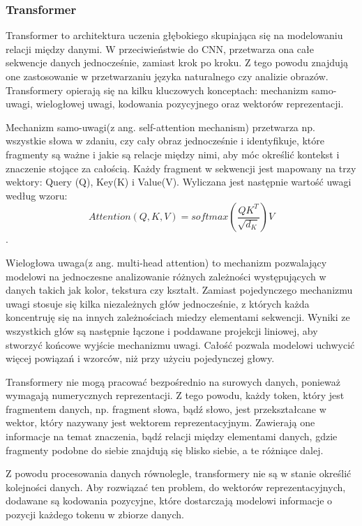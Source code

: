 \subsubsection{Transformer}
Transformer to architektura uczenia głębokiego skupiająca się na modelowaniu relacji między danymi. W przeciwieństwie do CNN, przetwarza ona całe sekwencje danych jednocześnie, zamiast krok po kroku. Z tego powodu znajdują one zastosowanie w przetwarzaniu języka naturalnego czy analizie obrazów. Transformery opierają się na kilku kluczowych konceptach: mechanizm samo-uwagi, wielogłowej uwagi, kodowania pozycyjnego oraz wektorów reprezentacji.

Mechanizm samo-uwagi(z ang. self-attention mechanism) przetwarza np. wszystkie słowa w zdaniu, czy cały obraz jednocześnie i identyfikuje, które fragmenty są ważne \newline i jakie są relacje między nimi, aby móc określić kontekst i znaczenie stojące za całością. Każdy fragment w sekwencji jest mapowany na trzy wektory: Query (Q), Key(K) i Value(V). Wyliczana jest następnie wartość uwagi według wzoru: $$Attention(Q,K,V) = softmax(\frac{QK^{T}}{\sqrt{d_{K}}})V $$.

Wielogłowa uwaga(z ang. multi-head attention) to mechanizm pozwalający modelowi na jednoczesne analizowanie różnych zależności występujących w danych takich jak kolor, tekstura czy kształt.
Zamiast pojedynczego mechanizmu uwagi stosuje się kilka niezależnych głów jednocześnie, z których każda koncentruję się na innych zależnościach miedzy elementami sekwencji. Wyniki ze wszystkich głów są następnie łączone i poddawane projekcji liniowej, aby stworzyć końcowe wyjście mechanizmu uwagi. Całość pozwala modelowi uchwycić więcej powiązań i wzorców, niż przy użyciu pojedynczej głowy. 

Transformery nie mogą pracować bezpośrednio na surowych danych, ponieważ wymagają numerycznych reprezentacji. Z tego powodu, każdy token, który jest fragmentem danych, np. fragment słowa, bądź słowo, jest przekształcane w wektor, który nazywany jest wektorem reprezentacyjnym. Zawierają one informacje na temat znaczenia, bądź relacji między elementami danych, gdzie fragmenty podobne do siebie znajdują się blisko siebie, a te różniące dalej.

Z powodu procesowania danych równolegle, transformery nie są w stanie określić kolejności danych. Aby rozwiązać ten problem, do wektorów reprezentacyjnych, dodawane są kodowania pozycyjne, które dostarczają modelowi informacje o pozycji każdego tokenu w zbiorze danych.\cite{DBLP:journals/corr/VaswaniSPUJGKP17}

